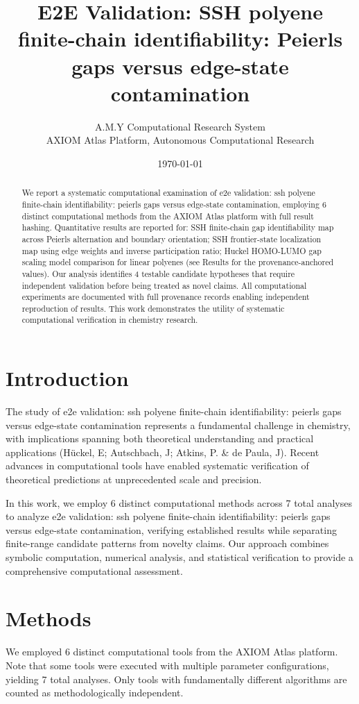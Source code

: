 \documentclass[11pt,a4paper]{article}
\title{E2E Validation: SSH polyene finite-chain identifiability: Peierls gaps versus edge-state contamination}
\author{A.M.Y Computational Research System\\
\small AXIOM Atlas Platform, Autonomous Computational Research}
\date{\today}
\begin{document}
\maketitle

\begin{abstract}
We report a systematic computational examination of e2e validation: ssh polyene finite-chain identifiability: peierls gaps versus edge-state contamination, employing 6 distinct computational methods from the AXIOM Atlas platform with full result hashing. Quantitative results are reported for: SSH finite-chain gap identifiability map across Peierls alternation and boundary orientation; SSH frontier-state localization map using edge weights and inverse participation ratio; Huckel HOMO-LUMO gap scaling model comparison for linear polyenes (see Results for the provenance-anchored values). Our analysis identifies 4 testable candidate hypotheses that require independent validation before being treated as novel claims. All computational experiments are documented with full provenance records enabling independent reproduction of results. This work demonstrates the utility of systematic computational verification in chemistry research.
\end{abstract}

\section{Introduction}
The study of e2e validation: ssh polyene finite-chain identifiability: peierls gaps versus edge-state contamination represents a fundamental challenge in chemistry, with implications spanning both theoretical understanding and practical applications (Hückel, E; Autschbach, J; Atkins, P. \& de Paula, J). Recent advances in computational tools have enabled systematic verification of theoretical predictions at unprecedented scale and precision.

In this work, we employ 6 distinct computational methods across 7 total analyses to analyze e2e validation: ssh polyene finite-chain identifiability: peierls gaps versus edge-state contamination, verifying established results while separating finite-range candidate patterns from novelty claims. Our approach combines symbolic computation, numerical analysis, and statistical verification to provide a comprehensive computational assessment.


\section{Methods}
We employed 6 distinct computational tools from the AXIOM Atlas platform. Note that some tools were executed with multiple parameter configurations, yielding 7 total analyses. Only tools with fundamentally different algorithms are counted as methodologically independent.
\end{document}
